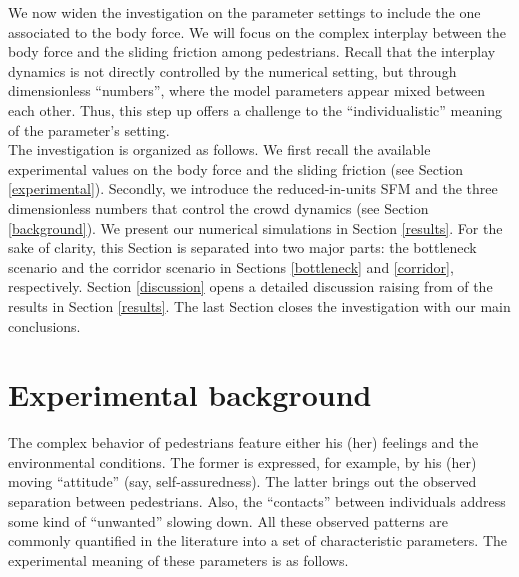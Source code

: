 \documentclass[preprint,12pt]{elsarticle}
\begin{document}
We now widen the investigation on the parameter settings to include the one 
associated to the body force. We will focus on the complex interplay between 
the body force and the sliding friction among pedestrians. Recall that the 
interplay dynamics is not directly controlled by the numerical setting, but 
through dimensionless ``numbers'', where the model parameters appear mixed 
between each other. Thus, this step up offers a challenge to the 
``individualistic'' meaning of the parameter's setting. \\  


The investigation is organized as follows. We first recall the available 
experimental values on the body force and the sliding friction (see Section 
\ref{experimental}). Secondly, we introduce the reduced-in-units SFM and the 
three dimensionless numbers that control the crowd dynamics (see Section 
\ref{background}). We present our numerical simulations in Section 
\ref{results}. For the sake of clarity, this Section is 
separated into two major parts: the bottleneck scenario and the corridor 
scenario in Sections \ref{bottleneck} and \ref{corridor}, respectively. 
Section \ref{discussion} opens a detailed discussion raising from of the results 
in Section \ref{results}. The last Section closes the investigation with our 
main conclusions.

\section{\label{experimental}Experimental background}

The complex behavior of pedestrians feature either his (her) feelings and 
the environmental conditions. The former is expressed, for example, by his 
(her) moving ``attitude'' (say, self-assuredness). The latter brings out the 
observed separation between pedestrians. Also, the ``contacts'' between 
individuals address some kind of ``unwanted'' slowing down. All these 
observed patterns are commonly quantified in the literature into a set of 
characteristic  parameters. The experimental meaning of these parameters is as 
follows.
\end{document}
